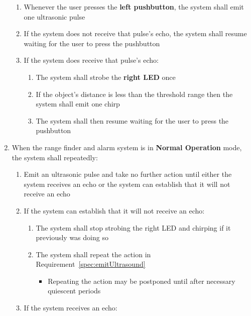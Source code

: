 \begin{enumerate}
\begin{enumerate}
            \item Whenever the user presses the \textbf{left pushbutton}, the system shall emit one ultrasonic pulse
            \item If the system does not receive that pulse's echo, the system shall resume waiting for the user to press the pushbutton
            \item \label{spec:singlePulseResponse} If the system does receive that pulse's echo:
                \begin{enumerate}
                    \item The system shall strobe the \textbf{right LED} once
                    \item If the object's distance is less than the threshold range then the system shall emit one chirp
                    \item The system shall then resume waiting for the user to press the pushbutton
                \end{enumerate}
        \end{enumerate}
    \item \label{spec:normalOperation} When the range finder and alarm system is in \textbf{Normal Operation} mode, the system shall repeatedly:
        \begin{enumerate}
            \item \label{spec:emitUltrasound} Emit an ultrasonic pulse and take no further action until either the system receives an echo or the system can establish that it will not receive an echo
            \item If the system can establish that it will not receive an echo:
                \begin{enumerate}
                    \item The system shall stop strobing the right LED and chirping if it previously was doing so
                    \item The system shall repeat the action in Requirement~\ref{spec:emitUltrasound}
                        {\footnotesize
                        \begin{itemize}
                             \item Repeating the action may be postponed until after necessary quiescent periods
                        \end{itemize}}
                \end{enumerate}
            \item If the system receives an echo:
                \begin{enumerate}

\end{enumerate}
\end{enumerate}
\end{enumerate}
